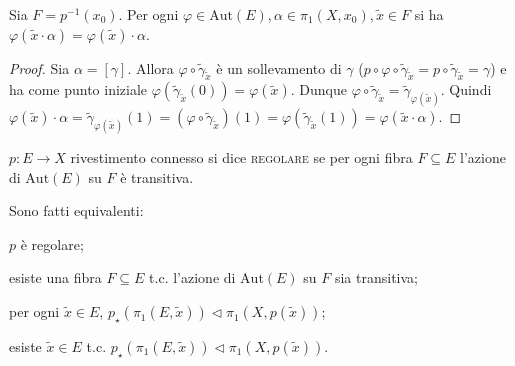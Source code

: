 \begin{thm} \label{mon_comm}
  Sia $F=p^{-1}(x_0)$. Per ogni $\varphi \in \text{Aut}(E), \alpha \in \pi_1(X, x_0), \tilde{x} \in F$ si ha $\varphi(\tilde{x} \cdot \alpha)=\varphi(\tilde{x}) \cdot \alpha$.
\end{thm}

\begin{proof}
  Sia $\alpha=[\gamma]$.
  Allora $\varphi \circ \tilde{\gamma}_{\tilde{x}}$ è un sollevamento di $\gamma$ ($p \circ \varphi \circ \tilde{\gamma}_{\tilde{x}}=p \circ \tilde{\gamma}_{\tilde{x}}=\gamma$) e ha come punto iniziale $\varphi(\tilde{\gamma}_{\tilde{x}}(0))=\varphi(\tilde{x})$.
  Dunque $\varphi \circ \tilde{\gamma}_{\tilde{x}}=\tilde{\gamma}_{\varphi(\tilde{x})}$.
  Quindi $\varphi(\tilde{x}) \cdot \alpha=\tilde{\gamma}_{\varphi(\tilde{x})}(1)=(\varphi \circ \tilde{\gamma}_{\tilde{x}})(1)=\varphi(\tilde{\gamma}_{\tilde{x}}(1))=\varphi(\tilde{x} \cdot \alpha)$.
\end{proof}

\begin{defn}
  $p:E \longrightarrow X$ rivestimento connesso si dice \textsc{regolare} se per ogni fibra $F \subseteq E$ l'azione di $\text{Aut}(E)$ su $F$ è transitiva.
\end{defn}

\begin{thm}
  Sono fatti equivalenti:
  \begin{nlist}
    \item $p$ è regolare;
    \item esiste una fibra $F \subseteq E$ t.c. l'azione di $\text{Aut}(E)$ su $F$ sia transitiva;
    \item per ogni $\tilde{x} \in E$, $p_{\star}(\pi_1(E, \tilde{x})) \vartriangleleft \pi_1(X, p(\tilde{x}))$;
    \item esiste $\tilde{x} \in E$ t.c. $p_{\star}(\pi_1(E, \tilde{x})) \vartriangleleft \pi_1(X, p(\tilde{x}))$.
  \end{nlist}
\end{thm}

